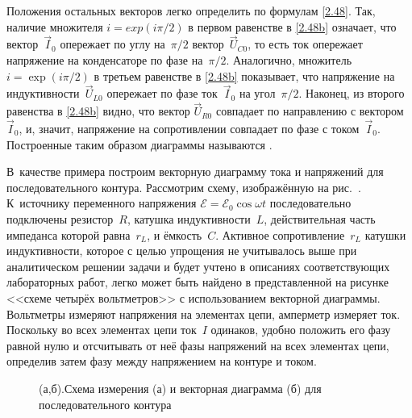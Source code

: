 Положения остальных векторов легко определить по формулам \eqref{2.48}. Так,
наличие множителя $i=exp(i\pi/2)$ в первом равенстве в \eqref{2.48b} означает,
что вектор~$\vec I_0$ опережает по углу на~$\pi/2$ вектор~$\vec U_{C0}$, то есть
ток опережает напряжение на конденсаторе по фазе на~$\pi/2$. Аналогично,
множитель $i=\exp(i\pi/2)$ в третьем равенстве в \eqref{2.48b} показывает, что
напряжение на индуктивности~$\vec U_{L0}$ опережает по фазе ток~$\vec I_0$ на
угол~$\pi/2$. Наконец, из второго равенства в \eqref{2.48b} видно, что вектор
$\vec U_{R0}$ совпадает по направлению с вектором~$\vec I_0$, и, значит,
напряжение на сопротивлении совпадает по фазе с током~$\vec I_0$. Построенные
таким образом диаграммы называются .

В~качестве примера построим векторную диаграмму тока и напряжений для
последовательного контура. Рассмотрим схему, изображённую на рис.~.
К~источнику переменного напряжения $\mathcal{E}=\mathcal{E}_0\cos\omega t$
последовательно подключены резистор~$R$, катушка индуктивности~$L$,
действительная часть импеданса которой равна~$r_L$, и ёмкость~$C$. Активное
сопротивление~$r_L$ катушки индуктивности, которое с целью упрощения не
учитывалось выше при аналитическом решении задачи и будет учтено в описаниях
соответствующих лабораторных работ, легко может быть найдено в представленной на
рисунке <<схеме четырёх вольтметров>> с использованием векторной диаграммы.
Вольтметры измеряют напряжения на элементах цепи, амперметр измеряет ток.
Поскольку во всех элементах цепи ток~$I$ одинаков, удобно положить его фазу
равной нулю и отсчитывать от неё фазы напряжений на всех элементах цепи,
определив затем фазу   между напряжением на контуре и током.

\begin{figure}[h]
	\begin{minipage}[h]{0.37\linewidth}
	\end{minipage}
	\hfill
	\begin{minipage}[h]{0.49\linewidth}
	\end{minipage}
	\caption{(а,б).Схема измерения (а) и векторная  диаграмма (б) для
последовательного контура}
\end{figure}

